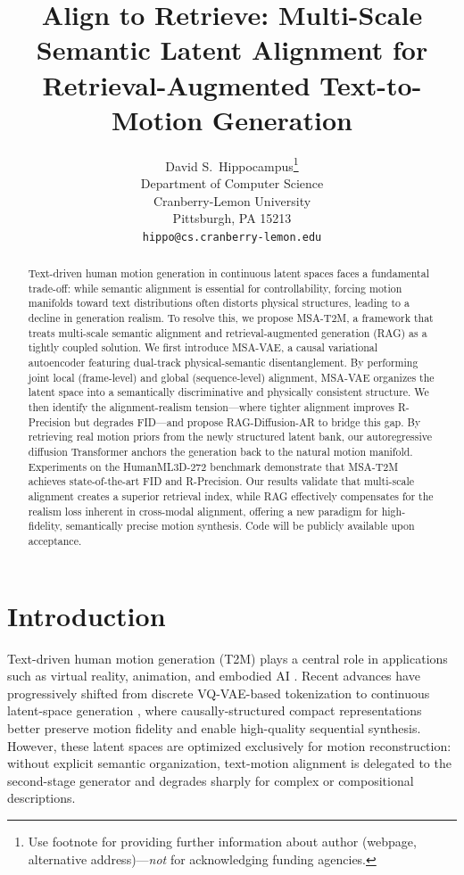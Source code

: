 \documentclass{article}
\title{Align to Retrieve: Multi-Scale Semantic Latent Alignment for Retrieval-Augmented Text-to-Motion Generation}
\author{%
  David S.~Hippocampus\thanks{Use footnote for providing further information
    about author (webpage, alternative address)---\emph{not} for acknowledging
    funding agencies.} \\
  Department of Computer Science\\
  Cranberry-Lemon University\\
  Pittsburgh, PA 15213 \\
  \texttt{hippo@cs.cranberry-lemon.edu} \\
}
\begin{document}
\maketitle

\begin{abstract}
Text-driven human motion generation in continuous latent spaces faces a fundamental trade-off: while semantic alignment is essential for controllability, forcing motion manifolds toward text distributions often distorts physical structures, leading to a decline in generation realism. To resolve this, we propose MSA-T2M, a framework that treats multi-scale semantic alignment and retrieval-augmented generation (RAG) as a tightly coupled solution. We first introduce MSA-VAE, a causal variational autoencoder featuring dual-track physical-semantic disentanglement. By performing joint local (frame-level) and global (sequence-level) alignment, MSA-VAE organizes the latent space into a semantically discriminative and physically consistent structure. We then identify the alignment-realism tension---where tighter alignment improves R-Precision but degrades FID---and propose RAG-Diffusion-AR to bridge this gap. By retrieving real motion priors from the newly structured latent bank, our autoregressive diffusion Transformer anchors the generation back to the natural motion manifold. Experiments on the HumanML3D-272 benchmark demonstrate that MSA-T2M achieves state-of-the-art FID and R-Precision. Our results validate that multi-scale alignment creates a superior retrieval index, while RAG effectively compensates for the realism loss inherent in cross-modal alignment, offering a new paradigm for high-fidelity, semantically precise motion synthesis.
Code will be publicly available upon acceptance.
\end{abstract}



\section{Introduction}

Text-driven human motion generation (T2M) plays a central role in applications such as virtual reality, animation, and embodied AI \citep{Guo_2022_CVPR,tevet2022human,xiao2025motionstreamer}.
Recent advances have progressively shifted from discrete VQ-VAE-based tokenization \citep{zhang2023generating} to continuous latent-space generation \citep{meng2024rethinking,meng2025absolute,xiao2025motionstreamer}, where causally-structured compact representations better preserve motion fidelity and enable high-quality sequential synthesis.
However, these latent spaces are optimized exclusively for motion reconstruction: without explicit semantic organization, text-motion alignment is delegated to the second-stage generator and degrades sharply for complex or compositional descriptions.
\end{document}

